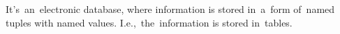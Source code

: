 \label{relationaldatabase}
It's~an~electronic database, where information is stored in~a~form of~named tuples with named values.
I.e.,~the~information is stored in~tables.
